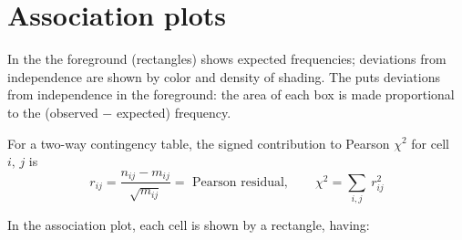 \documentclass[10pt,krantz2]{krantz}\usepackage[]{graphicx}\usepackage[]{color}
\begin{document}
\section{Association plots}\label{sec:twoway-assoc}
In the  the foreground (rectangles) shows expected
frequencies; deviations from independence are shown by color and
density of shading.  The 
\citep{Cohen:80,Friendly:91}
puts deviations from independence in the foreground:  the area
of each box is made proportional to the
(observed $-$ expected) frequency.

For a two-way contingency table, the signed contribution to Pearson
\(\chi^2\) for cell \(i, \, j\) is
\begin{equation}\label{eq:Pearson-residual}
  r_{ij}  =
  \frac{ n_{ij} - m_{ij} } { \sqrt { m_{ij} } }
 = \mbox{ Pearson residual},
  \qquad
  \chi^2 = \sum_{i,j} \: r_{ij}^2
\end{equation}

In the association plot, each cell is shown by a
rectangle, having:
\end{document}
